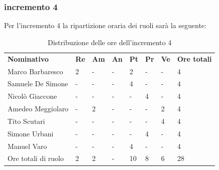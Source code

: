 \subsubsection{incremento 4}
Per l'incremento 4 la ripartizione oraria dei ruoli sarà la seguente:
\begin{center}
    \begin{table}[ht!]
        \centering
        \caption{Distribuzione delle ore dell'incremento 4}
        \vspace{5px}
        \renewcommand{\arraystretch}{1.8}
        \begin{tabular}{p{100px} p{20px} p{20px} p{20px} p{20px} p{20px} p{20px} p{50px} }
            \rowcolor{logo!70} \textbf{Nominativo} & \textbf{Re} & \textbf{Am} & \textbf{An} & \textbf{Pt} & \textbf{Pr} & \textbf{Ve} & \textbf{Ore totali} \\
            Marco Barbaresco                       & 2           & -           & -           & 2           & -           & -           & 4                   \\
            Samuele De Simone                      & -           & -           & -           & 4           & -           & -           & 4                   \\
            Nicolò Giaccone                        & -           & -           & -           & -           & 4           & -           & 4                   \\
            Amedeo Meggiolaro                      & -           & 2           & -           & -           & -           & 2           & 4                   \\
            Tito Scutari                           & -           & -           & -           & -           & -           & 4           & 4                   \\
            Simone Urbani                          & -           & -           & -           & -           & 4           & -           & 4                   \\
            Manuel Varo                            & -           & -           & -           & 4           & -           & -           & 4                   \\
            Ore totali di ruolo                    & 2           & 2           & -           & 10          & 8           & 6           & 28                  \\
        \end{tabular}
    \end{table}
\end{center}
